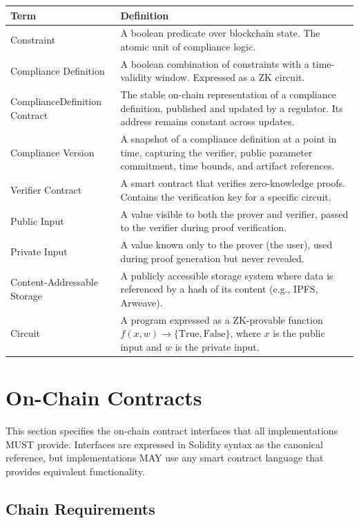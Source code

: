 \documentclass[9pt]{extreport}
\begin{document}
\begin{table}[h]
\centering
\small
\begin{tabular}{p{4.5cm}p{9.5cm}}
\toprule
\textbf{Term} & \textbf{Definition} \\
\midrule
Constraint & A boolean predicate over blockchain state. The atomic unit of compliance logic. \\
Compliance Definition & A boolean combination of constraints with a time-validity window. Expressed as a ZK circuit. \\
ComplianceDefinition Contract & The stable on-chain representation of a compliance definition, published and updated by a regulator. Its address remains constant across updates. \\
Compliance Version & A snapshot of a compliance definition at a point in time, capturing the verifier, public parameter commitment, time bounds, and artifact references. \\
Verifier Contract & A smart contract that verifies zero-knowledge proofs. Contains the verification key for a specific circuit. \\
Public Input & A value visible to both the prover and verifier, passed to the verifier during proof verification. \\
Private Input & A value known only to the prover (the user), used during proof generation but never revealed. \\
Content-Addressable Storage & A publicly accessible storage system where data is referenced by a hash of its content (e.g., IPFS, Arweave). \\
Circuit & A program expressed as a ZK-provable function $f(x, w) \to \{\text{True}, \text{False}\}$, where $x$ is the public input and $w$ is the private input. \\
\bottomrule
\end{tabular}
\end{table}


\section{On-Chain Contracts}
\label{sec:on-chain-contracts}

This section specifies the on-chain contract interfaces that all implementations MUST provide. Interfaces are expressed in Solidity syntax as the canonical reference, but implementations MAY use any smart contract language that provides equivalent functionality.

\subsection{Chain Requirements}
\label{sec:chain-requirements}
\end{document}
